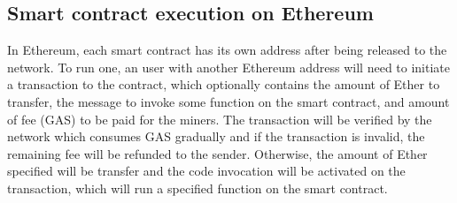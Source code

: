 \subsection{Smart contract execution on Ethereum}

In Ethereum, each smart contract has its own address after being released to the network. To run one, an user with another Ethereum address will need to initiate a transaction to the contract, which optionally contains the amount of Ether to transfer, the message to invoke some function on the smart contract, and amount of fee (GAS) to be paid for the miners. The transaction will be verified by the network which consumes GAS gradually and if the transaction is invalid, the remaining fee will be refunded to the sender. Otherwise, the amount of Ether specified will be transfer and the code invocation will be activated on the transaction, which will run a specified function on the smart contract.